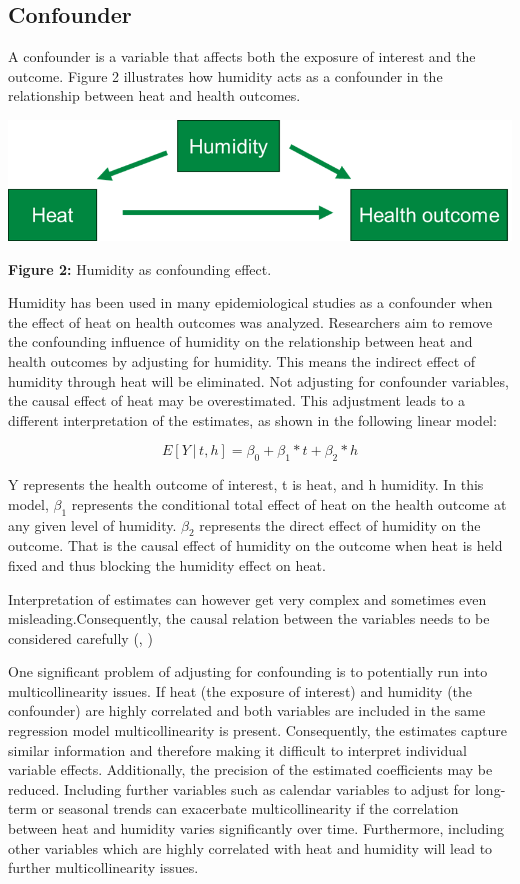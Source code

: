 \documentclass[
]{krantz}
\begin{document}
\subsection{Confounder}\label{confounder}

A confounder is a variable that affects both the exposure of interest and the outcome. Figure 2 illustrates how humidity acts as a confounder in the relationship between heat and health outcomes.

\begin{center}\includegraphics[width=0.8\linewidth]{Confounder} \end{center}

\textbf{Figure 2:} Humidity as confounding effect.

Humidity has been used in many epidemiological studies as a confounder when the effect of heat on health outcomes was analyzed. Researchers aim to remove the confounding influence of humidity on the relationship between heat and health outcomes by adjusting for humidity. This means the indirect effect of humidity through heat will be eliminated. Not adjusting for confounder variables, the causal effect of heat may be overestimated. This adjustment leads to a different interpretation of the estimates, as shown in the following linear model:

\[
Ε[Y│t,h]= β_0+ β_1*t+ β_2*h
\]

Y represents the health outcome of interest, t is heat, and h humidity. In this model, \(β_1\) represents the conditional total effect of heat on the health outcome at any given level of humidity. \(β_2\) represents the direct effect of humidity on the outcome. That is the causal effect of humidity on the outcome when heat is held fixed and thus blocking the humidity effect on heat.

Interpretation of estimates can however get very complex and sometimes even misleading.Consequently, the causal relation between the variables needs to be considered carefully (\citet{baldwin2023}, \citet{westreich2013})

One significant problem of adjusting for confounding is to potentially run into multicollinearity issues.
If heat (the exposure of interest) and humidity (the confounder) are highly correlated and both variables are included in the same regression model multicollinearity is present. Consequently, the estimates capture similar information and therefore making it difficult to interpret individual variable effects. Additionally, the precision of the estimated coefficients may be reduced. Including further variables such as calendar variables to adjust for long-term or seasonal trends can exacerbate multicollinearity if the correlation between heat and humidity varies significantly over time. Furthermore, including other variables which are highly correlated with heat and humidity will lead to further multicollinearity issues.
\end{document}
